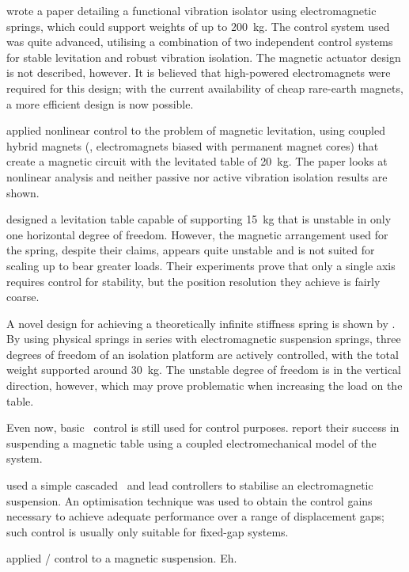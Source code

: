 \textcite{watanabe1996} wrote a paper detailing a functional vibration isolator using electromagnetic springs, which could support weights of up to
\SI{200}{kg}.
The control system used was quite advanced, utilising a combination of two independent control systems for stable levitation and robust vibration isolation.
The magnetic actuator design is not described, however.
It is believed that high-powered electromagnets were required for this design; with the current availability of cheap rare-earth magnets, a more efficient design is now possible.

\textcite{chang2001} applied nonlinear control to the problem of magnetic levitation, using coupled hybrid magnets (\ie, electromagnets biased with permanent magnet cores) that create a magnetic circuit with the levitated table of \SI{20}{kg}.
The paper looks at nonlinear analysis and neither passive nor active vibration isolation results are shown.

\textcite{choi2003} designed a levitation table capable of supporting \SI{15}{kg} that is unstable in only one horizontal degree of freedom.
However, the magnetic arrangement used for the spring, despite their claims, appears quite unstable and is not suited for scaling up to bear greater loads.
Their experiments prove that only a single axis requires control for stability, but the position resolution they achieve is fairly coarse.

A novel design for achieving a theoretically infinite stiffness spring is shown by \textcite{mizuno2003a,mizuno2003b}.
By using physical springs in series with electromagnetic suspension springs, three degrees of freedom of an isolation platform are actively controlled, with the total weight supported around \SI{30}{kg}.
The unstable degree of freedom is in the vertical direction, however, which may prove problematic when increasing the load on the table.

Even now, basic \PID\ control is still used for control purposes.
\textcite{li2007} report their success in suspending a magnetic table using a coupled electromechanical model of the system.

\textcite{banerjee2008} used a simple cascaded \PI\ and lead controllers to stabilise an electromagnetic suspension.
An optimisation technique was used to obtain the control gains necessary to achieve adequate performance over a range of displacement gaps; such control is usually only suitable for fixed-gap systems.

\textcite{gosiewski2008} applied \Hinf/ control to a magnetic suspension.
Eh.





